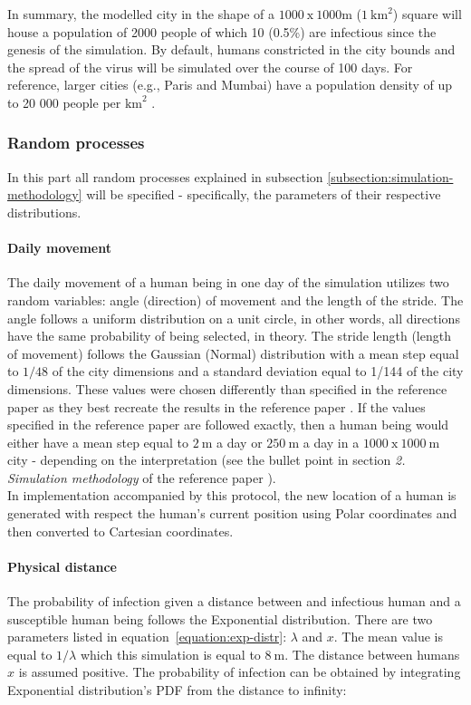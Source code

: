 \documentclass[a4paper]{article}
\begin{document}
In summary, the modelled city in the shape of a $1000\:\textrm{x}\:1000\textrm{m}$ ($1\: \textrm{km}^2$) square will house a population of 2000 people of which 10 (0.5\%) are infectious since the genesis of the simulation. By default, humans constricted in the city bounds and the spread of the virus will be simulated over the course of 100 days. For reference, larger cities (e.g., Paris and Mumbai) have a population density of up to 20 000 people per $\textrm{km}^2$ \cite{GnfKtXcXYiGm8NmR}\cite{YyQLmGbzBu9Drxx5}.


\subsubsection{Random processes}
In this part all random processes explained in subsection \ref{subsection:simulation-methodology} will be specified - specifically, the parameters of their respective distributions.

\paragraph{Daily movement}
The daily movement of a human being in one day of the simulation utilizes two random variables: angle (direction) of movement and the length of the stride. The angle follows a uniform distribution on a unit circle, in other words, all directions have the same probability of being selected, in theory. The stride length (length of movement) follows the Gaussian (Normal) distribution with a mean step equal to $1/48$ of the city dimensions and a standard deviation equal to 1/144 of the city dimensions. These values were chosen differently than specified in the reference paper as they best recreate the results in the reference paper \cite{Maltezos2021}. If the values specified in the reference paper \cite{Maltezos2021} are followed exactly, then a human being would either have a mean step equal to $2\:\textrm{m}$ a day or $250\:\textrm{m}$ a day in a $1000\:\textrm{x}\:1000\:\textrm{m}$ city - depending on the interpretation (see the  bullet point in section \textit{2. Simulation methodology} of the reference paper \cite{Maltezos2021}).\\
In implementation accompanied by this protocol, the new location of a human is generated with respect the human's current position using Polar coordinates and then converted to Cartesian coordinates.

\paragraph{Physical distance}
The probability of infection given a distance between and infectious human and a susceptible human being follows the Exponential distribution. There are two parameters listed in equation~\ref{equation:exp-distr}: $\lambda$ and $x$. The mean value is equal to $1/\lambda$ which this simulation is equal to $8\:\textrm{m}$. The distance between humans $x$ is assumed positive. The probability of infection can be obtained by integrating Exponential distribution's PDF from the distance to infinity:
\end{document}

